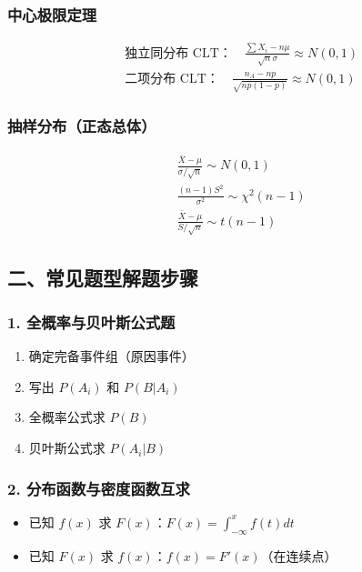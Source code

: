 \documentclass[12pt,a4paper]{ctexart}
\begin{document}
\subsubsection*{中心极限定理}
\begin{align*}
     & \text{独立同分布 CLT：}\quad \frac{\sum X_i - n\mu}{\sqrt{n}\sigma} \approx N(0,1) \\
     & \text{二项分布 CLT：}\quad \frac{n_A - np}{\sqrt{np(1-p)}} \approx N(0,1)
\end{align*}

\subsubsection*{抽样分布（正态总体）}
\begin{align*}
     & \frac{\bar{X} - \mu}{\sigma/\sqrt{n}} \sim N(0, 1) \\
     & \frac{(n-1)S^2}{\sigma^2} \sim \chi^2(n-1)         \\
     & \frac{\bar{X} - \mu}{S/\sqrt{n}} \sim t(n-1)
\end{align*}

\subsection*{二、常见题型解题步骤}

\subsubsection*{1. 全概率与贝叶斯公式题}
\begin{enumerate}[noitemsep]
    \item 确定完备事件组（原因事件）
    \item 写出 $P(A_i)$ 和 $P(B|A_i)$
    \item 全概率公式求 $P(B)$
    \item 贝叶斯公式求 $P(A_i|B)$
\end{enumerate}

\subsubsection*{2. 分布函数与密度函数互求}
\begin{itemize}[noitemsep]
    \item 已知 $f(x)$ 求 $F(x)$：$F(x) = \int_{-\infty}^x f(t) dt$
    \item 已知 $F(x)$ 求 $f(x)$：$f(x) = F'(x)$（在连续点）
\end{itemize}
\end{document}
